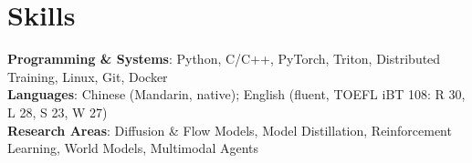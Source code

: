 \documentclass[a4paper,11pt]{article}
\begin{document}
\section{Skills}
 \begin{itemize}[leftmargin=0.10in, label={}, topsep=1pt]
    \small{\item{
     \textbf{Programming \& Systems}{: Python, C/C++, PyTorch, Triton, Distributed Training, Linux, Git, Docker} \\
     \textbf{Languages}{: Chinese (Mandarin, native); English (fluent, TOEFL iBT 108: R 30, L 28, S 23, W 27)} \\
     \textbf{Research Areas}{: Diffusion \& Flow Models, Model Distillation, Reinforcement Learning, World Models, Multimodal Agents}
    }}
 \end{itemize}
\end{document}
